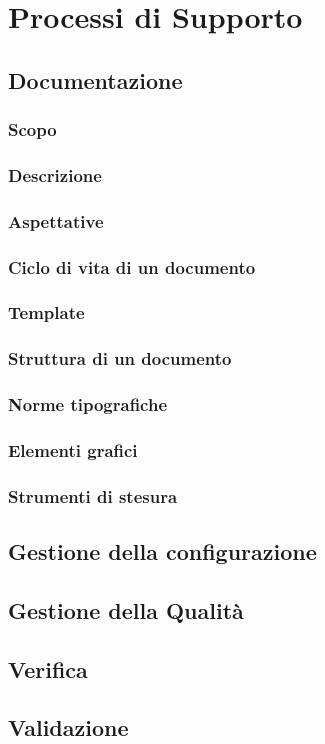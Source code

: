 \section{Processi di Supporto}
    \subsection{Documentazione}
        \subsubsection{Scopo}
        \subsubsection{Descrizione}
        \subsubsection{Aspettative}
        \subsubsection{Ciclo di vita di un documento}
        \subsubsection{Template}
        \subsubsection{Struttura di un documento}
        \subsubsection{Norme tipografiche}
        \subsubsection{Elementi grafici}
        \subsubsection{Strumenti di stesura}
            \subsubsubsection{\LaTeX}
    \subsection{Gestione della configurazione}
    \subsection{Gestione della Qualità}
    \subsection{Verifica}
    \subsection{Validazione}
